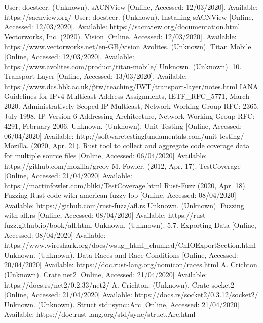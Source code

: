 \documentclass[11pt,a4paper]{article}
\begin{document}
\begin{thebibliography}{20}
	User: docsteer. (Unknown). sACNView [Online, Accessed: 12/03/2020]. Available: https://sacnview.org/
	User: docsteer. (Unknown). Installing sACNView [Online, Accessed: 12/03/2020]. Available: https://sacnview.org/documentation.html
	Vectorworks, Inc. (2020). Vision [Online, Accessed: 12/03/2020]. Available:
	https://www.vectorworks.net/en-GB/vision
	Avolites. (Unknown). Titan Mobile [Online, Accessed: 12/03/2020]. Available: https://www.avolites.com/product/titan-mobile/
	Unknown. (Unknown). 10. Transport Layer [Online, Accessed: 13/03/2020]. Available: https://www.dcs.bbk.ac.uk/\~ptw/teaching/IWT/transport-layer/notes.html
	IANA Guidelines for IPv4 Multicast Address Assignments, IETF\_RFC\_5771, March 2020.
	Administratively Scoped IP Multicast, Network Working Group RFC: 2365, July 1998.
	IP Version 6 Addressing Architecture, Network Working Group RFC: 4291, February 2006.
	Unknown. (Unknown). Unit Testing [Online, Accessed: 06/04/2020] Available: http://softwaretestingfundamentals.com/unit-testing/
	Mozilla. (2020, Apr. 21). Rust tool to collect and aggregate code coverage data for multiple source files [Online, Accessed: 06/04/2020] Available: https://github.com/mozilla/grcov
	M. Fowler. (2012, Apr. 17). TestCoverage [Online, Accessed: 21/04/2020] Available: https://martinfowler.com/bliki/TestCoverage.html
	Rust-Fuzz (2020, Apr. 18). Fuzzing Rust code with american-fuzzy-lop [Online, Accessed: 08/04/2020] Available: https://github.com/rust-fuzz/afl.rs
	Unknown. (Unknown). Fuzzing with afl.rs [Online, Accessed: 08/04/2020] Available: https://rust-fuzz.github.io/book/afl.html
	Unknown. (Unknown). 5.7. Exporting Data [Online, Accessed: 08/04/2020] Available: 
	https://www.wireshark.org/docs/wsug\_html\_chunked/ChIOExportSection.html
	Unknown. (Unknown). Data Races and Race Conditions [Online, Accessed: 20/04/2020] Available: https://doc.rust-lang.org/nomicon/races.html
	A. Crichton. (Unknown). Crate net2 [Online, Accessed: 21/04/2020] Available: https://docs.rs/net2/0.2.33/net2/
	A. Crichton. (Unknown). Crate socket2 [Online, Accessed: 21/04/2020] Available:
	https://docs.rs/socket2/0.3.12/socket2/
	Unknown. (Unknown). Struct std::sync::Arc [Online, Accessed: 21/04/2020] Available: https://doc.rust-lang.org/std/sync/struct.Arc.html
\end{thebibliography}
\end{document}
